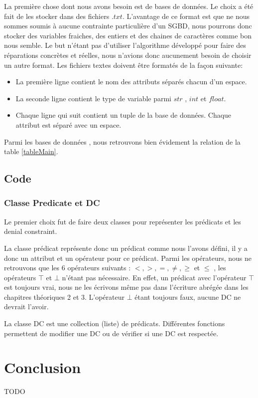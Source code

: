 \documentclass[letterpaper, 12pt]{report}
\theoremstyle{definition}
\begin{document}
La première chose dont nous avons besoin est de bases de données. Le choix a été fait de les stocker dans des fichiers $.txt$. L'avantage de ce format est que ne nous sommes soumis à aucune contrainte particulière d'un SGBD, nous pourrons donc stocker des variables fraiches, des entiers et des chaines de caractères comme bon nous semble. Le but n'étant pas d'utiliser l'algorithme développé pour faire des réparations concrètes et réelles, nous n'avions donc aucunement besoin de choisir un autre format. Les fichiers textes doivent être formatés de la façon suivante:
\begin{itemize}


\item La première ligne contient le nom des attributs séparés chacun d'un espace.
\item La seconde ligne contient le type de variable parmi $str$ , $int$ et $float$.
\item Chaque ligne qui suit contient un tuple de la base de données. Chaque attribut est séparé avec un espace.

\end{itemize}

Parmi les bases de données , nous retrouvons bien évidement la relation de la table \ref{tableMain}.

\section{Code}

\subsection{Classe Predicate et DC}

Le premier choix fut de faire deux classes pour représenter les prédicats et les denial constraint.

La classe prédicat représente donc un prédicat comme nous l'avons défini, il y a donc un attribut et un opérateur pour ce prédicat. Parmi les opérateurs, nous ne retrouvons que les 6 opérateurs suivants : $ < , >, = , \neq , \geq$ et $\leq$ , les opérateurs $ \top$ et $\bot $ n'étant pas nécessaire. En effet, un prédicat avec l'opérateur $\top$ est toujours vrai, nous ne les écrivons même pas dans l'écriture abrégée dans les chapitres théoriques 2 et 3. L'opérateur $\bot$ étant toujours faux, aucune DC ne devrait l'avoir.

La classe DC est une collection (liste) de prédicats. Différentes fonctions permettent de modifier une DC ou de vérifier si une DC est respectée.
\chapter{Conclusion}
TODO






\newpage
\appendix
\end{document}
